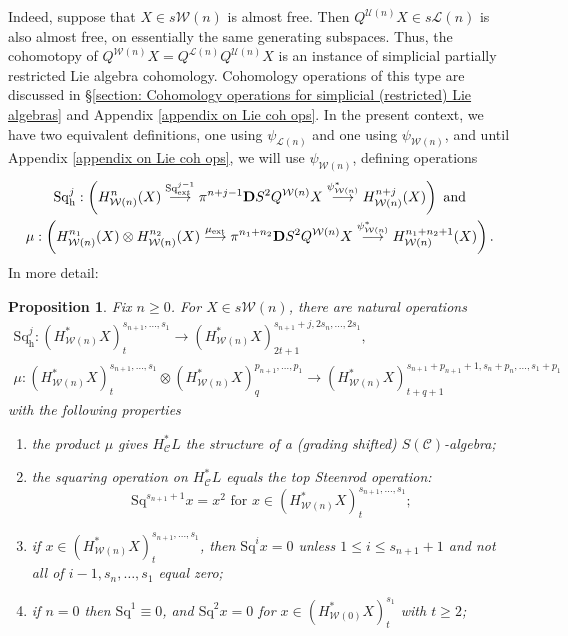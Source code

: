 \documentclass[11pt]{amsart} \renewcommand{\baselinestretch}{1.2}
\theoremstyle{plain}
\newtheorem{prop}[thm]{Proposition}
\numberwithin{equation}{section} %
\theoremstyle{plain}
\newtheorem{prop}[thm]{Proposition}
\numberwithin{equation}{chapter} %
\renewcommand{\to}{\longrightarrow}
\newcommand{\squishlist}{
}
\newcommand{\scrC}{\mathscr{C}}
\newcommand{\calU}{\mathcal{U}}
\newcommand{\calL}{\mathcal{L}}
\newcommand{\calw}{\mathcal{W}}
\newcommand{\calc}{\mathcal{C}}
\newcommand{\CommOperad}{{\scrC}}
\newcommand{\ExtCohOp}{\mathrm{Sq}_\mathrm{ext}}
\newcommand{\ExtCohProd}{\mu_\mathrm{ext}}
\newcommand{\Sq}{\mathrm{Sq}}
\newcommand{\dhor}{_\mathrm{h}}
\newcommand{\Sqh}{\mathrm{Sq}\dhor}
\newcommand{\dual}{\mathbf{D}}
\begin{document}
\begin{Cohomology Operations for W and U}
Indeed, suppose that $X\in s\calw(n)$ is almost free. Then $Q^{\calU(n)}X\in s\calL(n)$ is also almost free, on essentially the same generating subspaces. Thus, the cohomotopy of $Q^{\calw(n)}X=Q^{\calL(n)}Q^{\calU(n)}X$ is an instance of simplicial partially restricted Lie algebra cohomology. Cohomology operations of this type are discussed in \S\ref{section: Cohomology operations for simplicial (restricted) Lie algebras} and Appendix \ref{appendix on Lie coh ops}. In the present context, we have two equivalent definitions, one using $\psi_{\calL(n)}$ and one using $\psi_{\calw(n)}$, and until Appendix \ref{appendix on Lie coh ops}, we will use $\psi_{\calw(n)}$, defining operations
\begin{gather*}
\Sqh^j:\left(H_{\calw(n)}^{n}(X)\overset{\ExtCohOp^{j-1}}{\to} \pi^{n+j-1}\dual S^2Q^{\calw(n)}X\overset{\psi_{\calw(n)}^*}{\to} H_{\calw(n)}^{n+j}(X)\right)\textup{ and}\\
\mu:\left(H_{\calw(n)}^{n_1}(X)\otimes H_{\calw(n)}^{n_2}(X)\overset{\ExtCohProd}{\to} \pi^{n_1+n_2}\dual S^2Q^{\calw(n)}X\overset{\psi_{\calw(n)}^*}{\to} H_{\calw(n)}^{n_1+n_2+1}(X)\right).
\end{gather*}
In more detail:
\begin{prop}
\label{Wn Halg omnibus}
Fix $n\geq0$. For $X\in s\calw(n)$, there are natural operations
\begin{gather*}
\Sqh^j:(H^*_{\calw(n)}X)_t^{s_{n+1},\ldots,s_1}\to (H^*_{\calw(n)}X)_{2t+1}^{s_{n+1}+j,2s_{n},\ldots,2s_1},\\
\mu:(H^*_{\calw(n)}X)_t^{s_{n+1},\ldots,s_1}\otimes (H^*_{\calw(n)}X)_q^{p_{n+1},\ldots,p_1}\to (H^*_{\calw(n)}X)_{t+q+1}^{s_{n+1}+p_{n+1}+1,s_{n}+p_{n},\ldots,s_1+p_1}
\end{gather*}
with the following properties
\begin{enumerate}\squishlist
\item the product $\mu$ gives $H^*_{\calc}L$ the structure of a (grading shifted) $S(\CommOperad)$-algebra;
\item the squaring operation on $H^*_{\calc}L$ equals the \emph{top Steenrod operation}:
\[\Sq^{s_{n+1}+1}x=x^{2}\text{\ \ for $x\in (H^*_{\calw(n)}X)_t^{s_{n+1},\ldots,s_1}$};\]
\item \label{Sq unstable vanishing II} if $x\in (H^*_{\calw(n)}X)_t^{s_{n+1},\ldots,s_1}$, then $\Sq^ix=0$ unless $1\leq i\leq s_{n+1}+1$ and not all of $i-1,s_{n},\ldots,s_1$ equal zero;
\item \label{Sq unstable vanishing III} if $n=0$ then $\Sq^1\equiv 0$, and $\Sq^2x=0$ for $x\in (H^*_{\calw(0)}X)_t^{s_1}$ with $t\geq 2$;

\end{enumerate}
\end{prop}
\end{Cohomology Operations for W and U}
\end{document}
